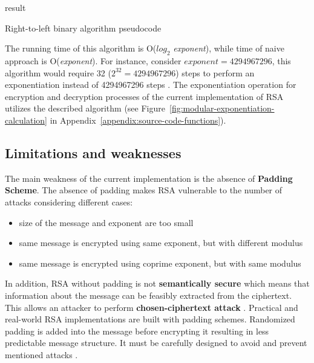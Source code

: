 \documentclass[11 pt]{article}
\begin{document}
\begin{algorithm}
    \begin{algorithmic}
            \ENDIF
        \ENDWHILE
        \RETURN result
    \end{algorithmic}
\caption{Right-to-left binary algorithm pseudocode \cite{Right-to-left binary method}}
\label{alg:right-to-left-binary-algorithm}
\end{algorithm}
\newline
The running time of this algorithm is O($log_{2}$ \textit{exponent}), while time of naive approach is O(\textit{exponent}). For instance, consider $exponent=4294967296$, this algorithm would require 32 ($2^{32} = 4294967296$) steps to perform an exponentiation instead of 4294967296 steps \cite{Right-to-left binary method}.
\newline
The exponentiation operation for encryption and decryption processes of the current implementation of RSA utilizes the described algorithm (see Figure~\ref{fig:modular-exponentiation-calculation} in Appendix~\ref{appendix:source-code-functions}).

\subsection{Limitations and weaknesses}
The main weakness of the current implementation is the absence of \textbf{Padding Scheme}. The absence of padding makes RSA vulnerable to the number of attacks \cite{RSA padding wiki, Asymmetric Ciphers II} considering different cases: 
\begin{itemize}
	\item size of the message and exponent are too small
	\item same message is encrypted using same exponent, but with different modulus
	\item same message is encrypted using coprime exponent, but with same modulus
\end{itemize}
In addition, RSA without padding is not \textbf{semantically secure} which means that information about the message can be feasibly extracted from the ciphertext. This allows an attacker to perform \textbf{chosen-ciphertext attack} \cite{RSA padding wiki}.
\newline
Practical and real-world RSA implementations are built with padding schemes. Randomized padding is added into the message before encrypting it resulting in less predictable message structure. It must be carefully designed to avoid and prevent mentioned attacks \cite{RSA padding wiki}.
\end{document}
